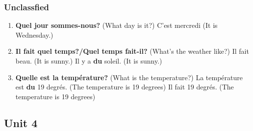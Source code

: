\documentclass[10pt,a4paper,twoside]{article} %
\begin{document}
\subsubsection*{Unclassfied}
\begin{enumerate}
    \item \textbf{Quel jour sommes-nous?} (What day is it?) \newline
    C'est mercredi (It is Wednesday.)
    \item \textbf{Il fait quel temps?/Quel temps fait-il?} (What's the weather like?) \newline
    Il fait beau. (It is sunny.) \newline
    Il y a \textbf{du} soleil. (It is sunny.)
    \item \textbf{Quelle est la température?} (What is the temperature?) \newline
    La température est \textbf{du} 19 degrés. (The temperature is 19 degrees) \newline
    Il fait 19 degrés. (The temperature is 19 degrees)
\end{enumerate}

\subsection*{Unit 4}
\end{document}
